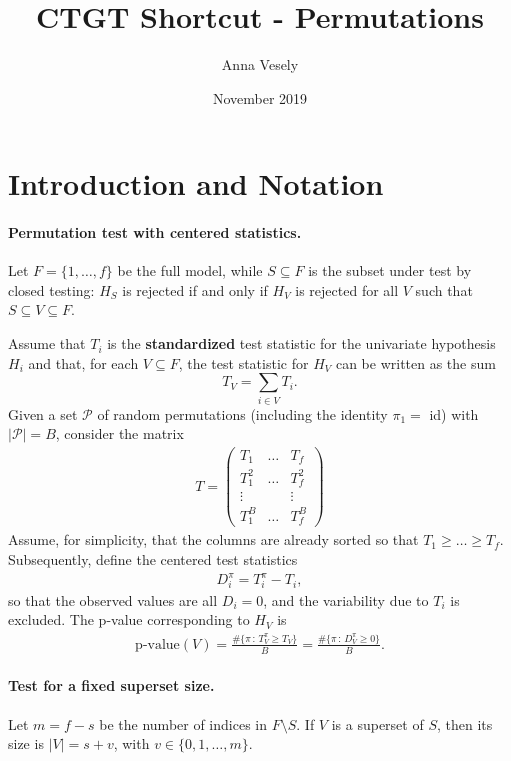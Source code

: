 \documentclass[11pt,a4paper,openright,twoside]{article}
\title{CTGT Shortcut - Permutations}
\author{Anna Vesely}
\date{November 2019}
\begin{document}
\maketitle





\section{Introduction and Notation}
\paragraph{Permutation test with centered statistics.}
Let $F=\{1,\ldots, f\}$ be the full model, while $S\subseteq F$ is the subset under test by closed testing: $H_S$ is rejected if and only if $H_V$ is rejected for all $V$ such that $S\subseteq V\subseteq F$.

Assume that $T_i$ is the \textbf{standardized} test statistic for the univariate hypothesis $H_i$ and that, for each $V\subseteq F$, the test statistic for $H_V$ can be written as the sum
\[T_V=\sum_{i\in V}T_i.\]
Given a set $\mathcal{P}$ of random permutations (including the identity $\pi_1=$ id) with $|\mathcal{P}|=B$, consider the matrix
\begin{align*}
T=
\begin{pmatrix}
T_1 & \ldots & T_f\\
T_1^2 & \ldots & T_f^2\\
\vdots &  & \vdots\\
T_1^B & \ldots & T_f^B
\end{pmatrix}
\end{align*}
Assume, for simplicity, that the columns are already sorted so that $T_1\geq\ldots\geq T_f$. Subsequently, define the centered test statistics
\begin{align*}
D_i^{\pi}=T_i^{\pi}-T_i,
\end{align*}
so that the observed values are all $D_i=0$, and the variability due to $T_i$ is excluded. The p-value corresponding to $H_V$ is
\begin{align*}
\text{p-value}(V)=\frac{\#\{\pi\,:\,T_V^{\pi}\geq T_V\}}{B}=\frac{\#\{\pi\,:\,D_V^{\pi}\geq 0\}}{B}.
\end{align*}


\vspace{3mm}
\paragraph{Test for a fixed superset size.} Let $m=f-s$ be the number of indices in $F\setminus S$. If $V$ is a superset of $S$, then its size is $|V|=s+v$, with $v\in\{0,1,\ldots,m\}$.
\end{document}
